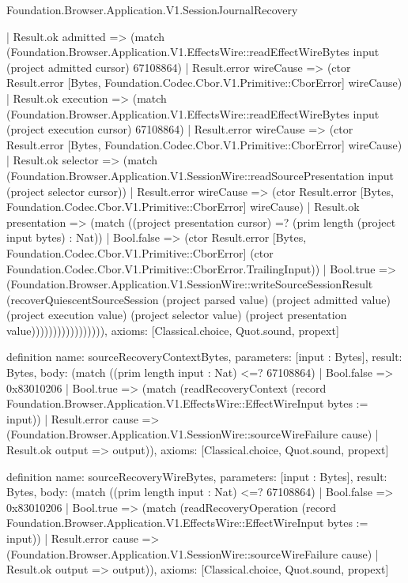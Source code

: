 \begin{lexlean}{Foundation.Browser.Application.V1.SessionJournalRecovery}
\begin{semanticmodule}
{                      | Result.ok admitted => (match (Foundation.Browser.Application.V1.EffectsWire::readEffectWireBytes input (project admitted cursor) 67108864)
                        | Result.error wireCause => (ctor Result.error [Bytes, Foundation.Codec.Cbor.V1.Primitive::CborError] wireCause)
                        | Result.ok execution => (match (Foundation.Browser.Application.V1.EffectsWire::readEffectWireBytes input (project execution cursor) 67108864)
                          | Result.error wireCause => (ctor Result.error [Bytes, Foundation.Codec.Cbor.V1.Primitive::CborError] wireCause)
                          | Result.ok selector => (match (Foundation.Browser.Application.V1.SessionWire::readSourcePresentation input (project selector cursor))
                            | Result.error wireCause => (ctor Result.error [Bytes, Foundation.Codec.Cbor.V1.Primitive::CborError] wireCause)
                            | Result.ok presentation => (match ((project presentation cursor) =? (prim length (project input bytes) : Nat))
                              | Bool.false => (ctor Result.error [Bytes, Foundation.Codec.Cbor.V1.Primitive::CborError] (ctor Foundation.Codec.Cbor.V1.Primitive::CborError.TrailingInput))
                              | Bool.true => (Foundation.Browser.Application.V1.SessionWire::writeSourceSessionResult (recoverQuiescentSourceSession (project parsed value) (project admitted value) (project execution value) (project selector value) (project presentation value))))))))))))))))),
  axioms: [Classical.choice, Quot.sound, propext]
}

definition{
  name: sourceRecoveryContextBytes,
  parameters: [input : Bytes],
  result: Bytes,
  body: (match ((prim length input : Nat) <=? 67108864)
    | Bool.false => 0x83010206
    | Bool.true => (match (readRecoveryContext (record Foundation.Browser.Application.V1.EffectsWire::EffectWireInput {bytes := input}))
      | Result.error cause => (Foundation.Browser.Application.V1.SessionWire::sourceWireFailure cause)
      | Result.ok output => output)),
  axioms: [Classical.choice, Quot.sound, propext]
}

definition{
  name: sourceRecoveryWireBytes,
  parameters: [input : Bytes],
  result: Bytes,
  body: (match ((prim length input : Nat) <=? 67108864)
    | Bool.false => 0x83010206
    | Bool.true => (match (readRecoveryOperation (record Foundation.Browser.Application.V1.EffectsWire::EffectWireInput {bytes := input}))
      | Result.error cause => (Foundation.Browser.Application.V1.SessionWire::sourceWireFailure cause)
      | Result.ok output => output)),
  axioms: [Classical.choice, Quot.sound, propext]
}
\end{semanticmodule}
\end{lexlean}
